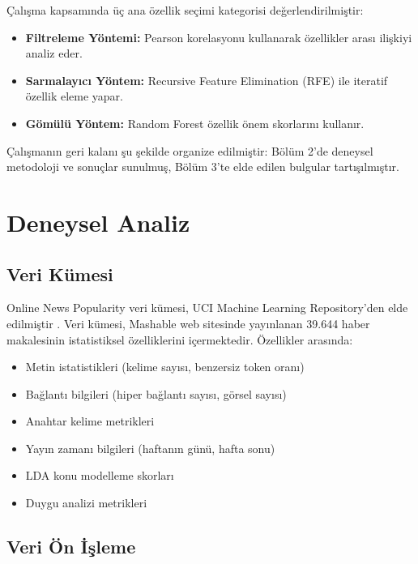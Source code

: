 \documentclass[conference]{IEEEtran}
\begin{document}
Çalışma kapsamında üç ana özellik seçimi kategorisi değerlendirilmiştir:
\begin{itemize}
    \item \textbf{Filtreleme Yöntemi:} Pearson korelasyonu kullanarak özellikler arası ilişkiyi analiz eder.
    \item \textbf{Sarmalayıcı Yöntem:} Recursive Feature Elimination (RFE) ile iteratif özellik eleme yapar.
    \item \textbf{Gömülü Yöntem:} Random Forest özellik önem skorlarını kullanır.
\end{itemize}

Çalışmanın geri kalanı şu şekilde organize edilmiştir: Bölüm 2'de deneysel metodoloji ve sonuçlar sunulmuş, Bölüm 3'te elde edilen bulgular tartışılmıştır.

\section{Deneysel Analiz}

\subsection{Veri Kümesi}

Online News Popularity veri kümesi, UCI Machine Learning Repository'den elde edilmiştir \cite{fernandes2015proactive}. Veri kümesi, Mashable web sitesinde yayınlanan 39.644 haber makalesinin istatistiksel özelliklerini içermektedir. Özellikler arasında:

\begin{itemize}
    \item Metin istatistikleri (kelime sayısı, benzersiz token oranı)
    \item Bağlantı bilgileri (hiper bağlantı sayısı, görsel sayısı)
    \item Anahtar kelime metrikleri
    \item Yayın zamanı bilgileri (haftanın günü, hafta sonu)
    \item LDA konu modelleme skorları
    \item Duygu analizi metrikleri
\end{itemize}

\subsection{Veri Ön İşleme}
\end{document}
